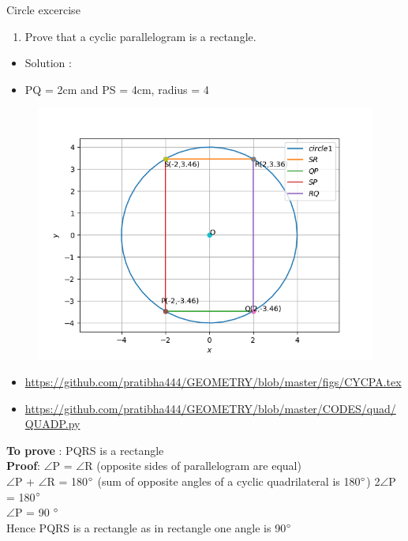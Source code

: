 \begin{frame}{Circle excercise}
\begin{enumerate}
\conti
\item Prove that a cyclic parallelogram is a rectangle.
\end{enumerate}
\seti
\begin{itemize}
\item Solution :
\begin{center}

\end{center}
\item PQ = 2cm and PS = 4cm, radius = 4
\end{itemize}
\end{frame}
\begin{frame}
\begin{figure}
\includegraphics[scale=.4]{./CODES/quad/QUAD_P.png}
\end{figure}
\begin{itemize}
\item\url{https://github.com/pratibha444/GEOMETRY/blob/master/figs/CYCPA.tex}
\item\url{https://github.com/pratibha444/GEOMETRY/blob/master/CODES/quad/QUADP.py}
\end{itemize}
\end{frame}
\begin{frame}
\textbf{To prove} : PQRS is a rectangle\\
\textbf{Proof}:
 $\angle$P = $\angle$R (opposite sides of parallelogram are equal)\\
$\angle$P + $\angle$R = 180$\degree$ (sum of opposite angles of a cyclic quadrilateral is 180$\degree$)
2$\angle$P = 180$\degree$\\
$\angle$P = 90 $\degree$\\
Hence PQRS is a rectangle as in rectangle one angle is 90$\degree$\\
\end{frame}